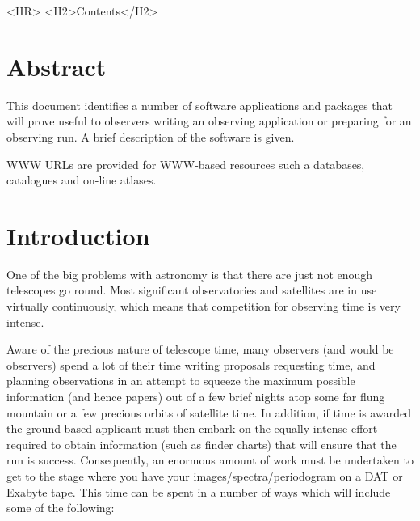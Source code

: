 \documentclass[twoside,11pt]{article}
\newcommand{\stardocinitials}  {SG}
\newcommand{\stardocnumber}    {10.2}
\newcommand{\stardocabstract}  {This document identifies a number of software
applications and packages that will prove useful to observers writing an
observing application or preparing for an observing run.
A brief description of the software is given.

WWW URLs are provided for WWW-based resources such a databases, catalogues and on-line atlases.
}
\newcommand{\stardocname}{\stardocinitials /\stardocnumber}
\newcommand{\htmladdimg}[1]{}
\newenvironment{latexonly}{}{}
\newcommand{\htmlref}[2]{#1}
\newcommand{\htmladdtonavigation}[1]{}
\newcommand{\xlabel}[1]{}
\newcommand{\latexonlytoc}[0]{\tableofcontents}
\renewcommand{\thepage}{\roman{page}}
\begin{document}
\begin{htmlonly}
  \label{stardoccontents}
  \begin{rawhtml}
    <HR>
    <H2>Contents</H2>
  \end{rawhtml}
  \newcommand{\latexonlytoc}[0]{}
  \htmladdtonavigation{\htmlref{\htmladdimg{contents_motif.gif}}
        {stardoccontents}}

  \section{\xlabel{abstract}Abstract}
\end{htmlonly}

\stardocabstract
 \newpage
 \begin{latexonly}
   \setlength{\parskip}{0mm}
   \latexonlytoc
   \setlength{\parskip}{\medskipamount}
   \markboth{\stardocname}{\stardocname}
 \end{latexonly}
\cleardoublepage
\renewcommand{\thepage}{\arabic{page}}

\setcounter{page}{1}

\section{Introduction} \xlabel{INTRODUCTION}
\label{sec:introduction}

One of the big problems with astronomy is that there are just not enough
telescopes go round. Most significant observatories and satellites are in use
virtually continuously, which means that competition
for observing time is very intense.

Aware of the precious nature of telescope time, many observers (and would be
observers) spend a lot of their time writing proposals requesting time, and
planning observations in an attempt to squeeze the maximum possible
information (and hence papers) out of a few brief nights atop some far flung
mountain or a few precious orbits of satellite time. In addition, if
time is awarded the ground-based applicant must then embark on the equally
intense effort required to obtain information (such as finder charts) that will
ensure that the run is success. Consequently, an enormous amount of work
must be undertaken to get to the stage where you have your
images/spectra/periodogram on a DAT or Exabyte tape. This time can be spent in a number of
ways which will include some of the following:
\end{document}
